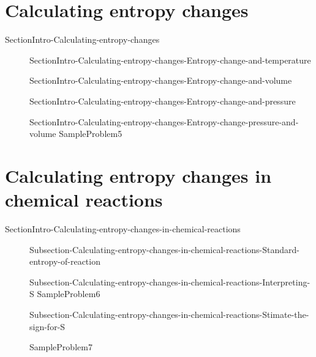 \documentclass[main.tex]{subfiles}
\begin{document}
  
 \section{Calculating entropy changes }
{SectionIntro-Calculating-entropy-changes}
\sloppy\begin{description}
 \item[]{SectionIntro-Calculating-entropy-changes-Entropy-change-and-temperature}
 \item[]{SectionIntro-Calculating-entropy-changes-Entropy-change-and-volume}
    \item[]{SectionIntro-Calculating-entropy-changes-Entropy-change-and-pressure} 
   \item[]{SectionIntro-Calculating-entropy-changes-Entropy-change-pressure-and-volume}
    {SampleProblem5}
   
 \end{description}
 
 
 
 \section{Calculating entropy changes in chemical reactions}{SectionIntro-Calculating-entropy-changes-in-chemical-reactions}
\sloppy\begin{description}
\item[]{Subsection-Calculating-entropy-changes-in-chemical-reactions-Standard-entropy-of-reaction}
\item[]{Subsection-Calculating-entropy-changes-in-chemical-reactions-Interpreting-S}
{SampleProblem6}
\item[]{Subsection-Calculating-entropy-changes-in-chemical-reactions-Stimate-the-sign-for-S}


{SampleProblem7}
\end{description}
\end{document}
